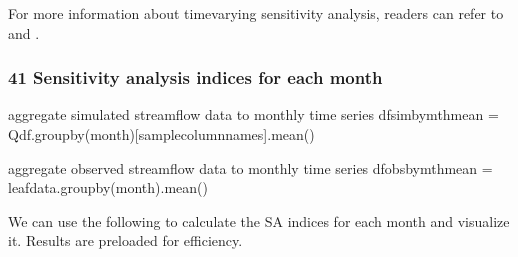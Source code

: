 \documentclass[letterpaper,10pt,english]{book}
\begin{document}
\sphinxAtStartPar
For more information about time\sphinxhyphen{}varying sensitivity analysis, readers
can refer to 
and .


\subsubsection{4\sphinxhyphen{}1 Sensitivity analysis indices for each month}
\label{\detokenize{A2_Jupyter_Notebooks:sensitivity-analysis-indices-for-each-month}}
\begin{sphinxVerbatim}[commandchars=\\\{\}]
\PYGZsh{} aggregate simulated streamflow data to monthly time series
df\PYGZus{}sim\PYGZus{}by\PYGZus{}mth\PYGZus{}mean = Q\PYGZus{}df.groupby(\PYGZsq{}month\PYGZsq{})[sample\PYGZus{}column\PYGZus{}names].mean()

\PYGZsh{} aggregate observed streamflow data to monthly time series
df\PYGZus{}obs\PYGZus{}by\PYGZus{}mth\PYGZus{}mean = leaf\PYGZus{}data.groupby(\PYGZsq{}month\PYGZsq{}).mean()
\end{sphinxVerbatim}

\sphinxAtStartPar
We can use the following to calculate the SA indices for each month and
visualize it. Results are pre\sphinxhyphen{}loaded for efficiency.
\end{document}
